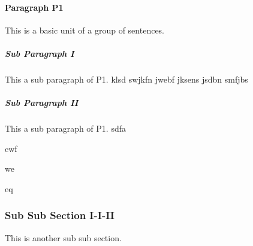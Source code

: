 \paragraph*{Paragraph P1} This is a basic unit of a group of sentences.

\subparagraph*{Sub Paragraph I} This a sub paragraph of P1. 
klsd 
swjkfn
jwebf
jksens
jsdbn
smfjbs
\subparagraph*{Sub Paragraph II} This a sub paragraph of P1. 
sdfa

ewf


we


eq

\subsubsection{Sub Sub Section I-I-II} 
This is another sub sub section.